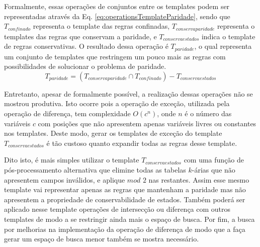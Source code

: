 Formalmente, essas operações de conjuntos entre os templates podem ser representadas através da Eq. \eqref{eq:operationsTemplateParidade}, sendo que $T_{confinado}$ representa o template das regras confinadas, $T_{conservaparidade}$ representa o templates das regras que conservam a paridade, e ${T}_{conservaestados}$ indica o template de regras conservativas. O resultado dessa operação é $T_{paridade}$, o qual representa um conjunto de templates que restringem um pouco mais as regras com possibilidades de solucionar o problema de paridade.
\begin{equation}
T_{paridade} = (T_{conservaparidade} \cap T_{confinado}) - {T}_{conservaestados}
\label{eq:operationsTemplateParidade}
\end{equation}

Entretanto, apesar de formalmente possível, a realização dessas operações não se mostrou produtiva. Isto ocorre pois a operação de exceção, utilizada pela operação de diferença, tem complexidade $O(c^n)$, onde $n$ é o número das variáveis $c$ com posições que não apresentem apenas variáveis livres ou constantes nos templates. Deste modo, gerar os templates de exceção do template $T_{conservaestados}$ é tão custoso quanto expandir todas as regras desse template.

Dito isto, é mais simples utilizar o template $T_{conservaestados}$ com uma função de pós-processamento alternativa que elimine todas as tabelas $k$-árias que não apresentem campos inválidos, e aplique $mod$ $2$ nas restantes. Assim  esse mesmo template vai representar apenas as regras que mantenham a paridade mas não apresentem a propriedade de conservabilidade de estados. Também poderá ser aplicado nesse template operações de intersecção ou diferença com outros templates de modo a se restringir ainda mais o espaço de busca. Por fim, a busca por melhorias na implementação da operação de diferença de modo que a faça gerar um espaço de busca menor também se mostra necessário.